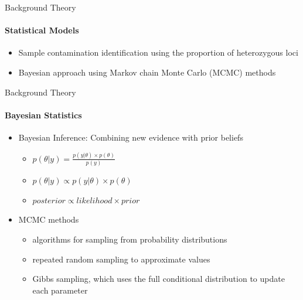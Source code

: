 \documentclass[letter,graphicx]{beamer}
\begin{document}
\begin{frame}{Background Theory}
\framesubtitle{Statistical Models}
   \begin{itemize}
   	\item Sample contamination identification using the proportion of heterozygous loci
	\vspace{3mm}
	\item Bayesian approach using Markov chain Monte Carlo (MCMC) methods
   \end{itemize}
\end{frame}

\begin{frame}{Background Theory}
\framesubtitle{Bayesian Statistics}
\begin{itemize}
\item Bayesian Inference: Combining new evidence with prior beliefs
	\vspace{1mm}
	\begin{itemize}
	\item $p(\theta|y) = \frac{p(y|\theta) \times p(\theta)}{p(y)}$
	\vspace{2mm}
	\item $p(\theta|y) \propto p(y|\theta) \times p(\theta)$
	\vspace{2mm}
	\item $posterior \propto likelihood \times prior$
	\end{itemize}
	\vspace{2mm}
\item MCMC methods
	\vspace{1mm}
	\begin{itemize}
	\item algorithms for sampling from probability distributions
	\vspace{2mm}
	\item repeated random sampling to approximate values
	\vspace{2mm}
	\item Gibbs sampling, which uses the full conditional distribution to update each parameter
	\end{itemize}
\end{itemize}
\end{frame}
\end{document}
